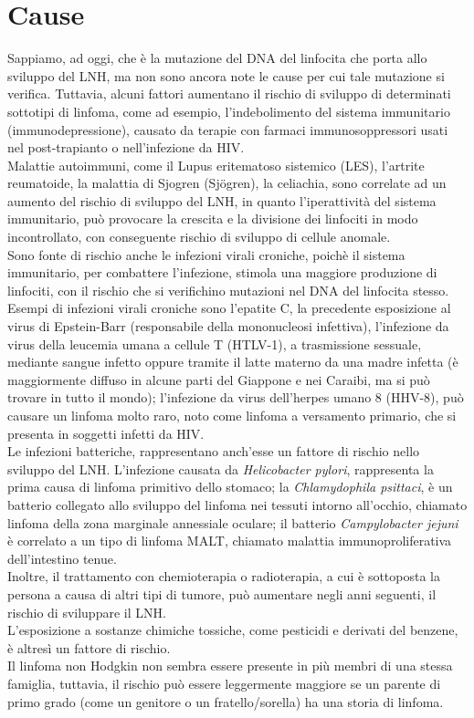 \section{Cause}
Sappiamo, ad oggi, che è la mutazione del DNA del linfocita che porta allo sviluppo del LNH, 
ma non sono ancora note le cause per cui tale mutazione si verifica. 
Tuttavia, alcuni fattori aumentano il rischio di sviluppo di determinati sottotipi di linfoma, come ad esempio, 
l’indebolimento del sistema immunitario (immunodepressione), causato da terapie con farmaci 
immunosoppressori usati nel post-trapianto o nell'infezione da HIV\cite{AMERICANCS}.\\
Malattie autoimmuni, come il Lupus eritematoso sistemico (LES), l'artrite reumatoide, 
la malattia di Sjogren (Sjögren), la celiachia, sono correlate ad un aumento del rischio di sviluppo del LNH, 
in quanto l’iperattività del sistema immunitario, può provocare la crescita e la 
divisione dei linfociti in modo incontrollato, 
con conseguente rischio di sviluppo di cellule anomale\cite{AMERICANCS}.\\
Sono fonte di rischio anche le infezioni virali croniche, poichè il sistema immunitario, 
per combattere l’infezione, stimola una maggiore produzione di linfociti, con il rischio che si 
verifichino mutazioni nel DNA del linfocita stesso. Esempi di infezioni virali croniche sono l’epatite C, 
la precedente esposizione al virus di Epstein-Barr (responsabile della mononucleosi infettiva), 
l'infezione da virus della leucemia umana a cellule T (HTLV-1), a trasmissione sessuale, mediante sangue infetto 
oppure tramite il latte materno da una madre infetta (è maggiormente diffuso in alcune parti del 
Giappone e nei Caraibi, ma si può trovare in tutto il mondo); l’infezione da virus dell'herpes umano 8 (HHV-8), 
può causare un linfoma molto raro, noto come linfoma a versamento primario, che si presenta in soggetti infetti da 
HIV\cite{AMERICANCS}.\\
Le infezioni batteriche, rappresentano anch’esse un fattore di rischio nello sviluppo del LNH. 
L’infezione causata da \emph{Helicobacter pylori}, rappresenta la prima causa di linfoma primitivo dello stomaco; 
la \emph{Chlamydophila psittaci}, è un batterio collegato allo sviluppo del linfoma nei tessuti intorno all’occhio, 
chiamato linfoma della zona marginale annessiale oculare; il batterio \emph{Campylobacter jejuni} è correlato a un tipo 
di linfoma MALT, chiamato malattia immunoproliferativa dell'intestino tenue\cite{AMERICANCS}.\\
Inoltre, il trattamento con chemioterapia o radioterapia, a cui è sottoposta la persona a causa di altri tipi di tumore, 
può aumentare negli anni seguenti, il rischio di sviluppare il LNH\cite{AMERICANCS}.\\
L’esposizione a sostanze chimiche tossiche, come pesticidi e derivati del benzene, è altresì un fattore di rischio.\\ 
Il linfoma non Hodgkin non sembra essere presente in più membri di una stessa famiglia, tuttavia, 
il rischio può essere leggermente maggiore se un parente di primo grado (come un genitore o un fratello/sorella) 
ha una storia di linfoma\cite{AMERICANCS}.

